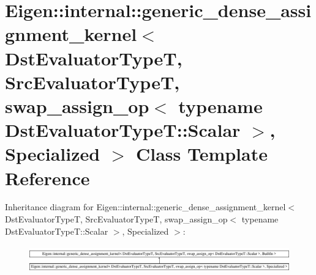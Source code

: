 \hypertarget{class_eigen_1_1internal_1_1generic__dense__assignment__kernel_3_01_dst_evaluator_type_t_00_01_sr759181e846694beea0b332c7e3bbe519}{}\section{Eigen\+::internal\+::generic\+\_\+dense\+\_\+assignment\+\_\+kernel$<$ Dst\+Evaluator\+TypeT, Src\+Evaluator\+TypeT, swap\+\_\+assign\+\_\+op$<$ typename Dst\+Evaluator\+TypeT\+::Scalar $>$, Specialized $>$ Class Template Reference}
\label{class_eigen_1_1internal_1_1generic__dense__assignment__kernel_3_01_dst_evaluator_type_t_00_01_sr759181e846694beea0b332c7e3bbe519}
Inheritance diagram for Eigen\+::internal\+::generic\+\_\+dense\+\_\+assignment\+\_\+kernel$<$ Dst\+Evaluator\+TypeT, Src\+Evaluator\+TypeT, swap\+\_\+assign\+\_\+op$<$ typename Dst\+Evaluator\+TypeT\+::Scalar $>$, Specialized $>$\+:\begin{figure}[H]
\begin{center}
\leavevmode
\includegraphics[height=1.167883cm]{class_eigen_1_1internal_1_1generic__dense__assignment__kernel_3_01_dst_evaluator_type_t_00_01_sr759181e846694beea0b332c7e3bbe519}
\end{center}
\end{figure}
